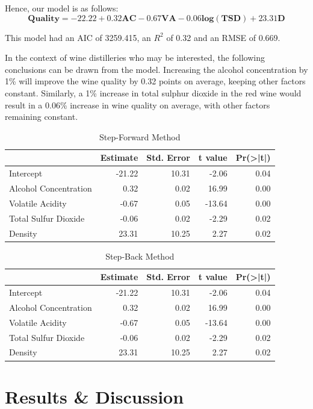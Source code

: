 \documentclass[letterpaper,8pt,twocolumn,twoside,]{pinp}
\begin{document}
Hence, our model is as follows: \[
\mathbf{Quality = -22.22 + 0.32AC -0.67VA - 0.06log(TSD) + 23.31D}
\]

This model had an AIC of 3259.415, an \(R^2\) of 0.32 and an RMSE of
0.669.

In the context of wine distilleries who may be interested, the following
conclusions can be drawn from the model. Increasing the alcohol
concentration by 1\% will improve the wine quality by 0.32 points on
average, keeping other factors constant. Similarly, a 1\% increase in
total sulphur dioxide in the red wine would result in a 0.06\% increase
in wine quality on average, with other factors remaining constant.

\begin{table}[!h]

\caption{\label{tab:unnamed-chunk-1}Step-Forward Method}
\centering
\begin{tabular}[t]{lrrrr}
\toprule
  & Estimate & Std. Error & t value & Pr(>|t|)\\
\midrule
Intercept & -21.22 & 10.31 & -2.06 & 0.04\\
Alcohol Concentration & 0.32 & 0.02 & 16.99 & 0.00\\
Volatile Acidity & -0.67 & 0.05 & -13.64 & 0.00\\
Total Sulfur Dioxide & -0.06 & 0.02 & -2.29 & 0.02\\
Density & 23.31 & 10.25 & 2.27 & 0.02\\
\bottomrule
\end{tabular}
\end{table}

\begin{table}[!h]

\caption{\label{tab:unnamed-chunk-1}Step-Back Method}
\centering
\begin{tabular}[t]{lrrrr}
\toprule
  & Estimate & Std. Error & t value & Pr(>|t|)\\
\midrule
Intercept & -21.22 & 10.31 & -2.06 & 0.04\\
Alcohol Concentration & 0.32 & 0.02 & 16.99 & 0.00\\
Volatile Acidity & -0.67 & 0.05 & -13.64 & 0.00\\
Total Sulfur Dioxide & -0.06 & 0.02 & -2.29 & 0.02\\
Density & 23.31 & 10.25 & 2.27 & 0.02\\
\bottomrule
\end{tabular}
\end{table}

\hypertarget{results-discussion}{%
\section{Results \& Discussion}\label{results-discussion}}
\end{document}
